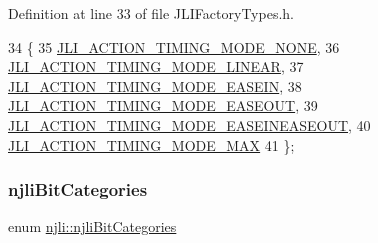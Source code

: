 Definition at line 33 of file J\+L\+I\+Factory\+Types.\+h.


\begin{DoxyCode}
34   \{
35     \mbox{\hyperlink{namespacenjli_affc383078a5935be1509062828a1824ba0cdba41a676d719a944fdc44d3e62899}{JLI\_ACTION\_TIMING\_MODE\_NONE}},
36     \mbox{\hyperlink{namespacenjli_affc383078a5935be1509062828a1824baa92e26f10321c835d6ea436a5fa0264e}{JLI\_ACTION\_TIMING\_MODE\_LINEAR}},
37     \mbox{\hyperlink{namespacenjli_affc383078a5935be1509062828a1824ba08be3eb3f43ae177aa8fd4b34e2407ee}{JLI\_ACTION\_TIMING\_MODE\_EASEIN}},
38     \mbox{\hyperlink{namespacenjli_affc383078a5935be1509062828a1824bacce80ae1388691ac76b7dc4949c9f51a}{JLI\_ACTION\_TIMING\_MODE\_EASEOUT}},
39     \mbox{\hyperlink{namespacenjli_affc383078a5935be1509062828a1824ba6676cf1fcd9e34bd15ba1964f4272bd6}{JLI\_ACTION\_TIMING\_MODE\_EASEINEASEOUT}},
40     \mbox{\hyperlink{namespacenjli_affc383078a5935be1509062828a1824badb523c2202cc055b57f6d532b99ddfa0}{JLI\_ACTION\_TIMING\_MODE\_MAX}}
41   \};
\end{DoxyCode}
\mbox{\label{namespacenjli_af7b302a2b48bb644f85c88080925c974}} 
\subsubsection{\texorpdfstring{njli\+Bit\+Categories}{njliBitCategories}}
{\footnotesize\ttfamily enum \mbox{\hyperlink{namespacenjli_af7b302a2b48bb644f85c88080925c974}{njli\+::njli\+Bit\+Categories}}}

